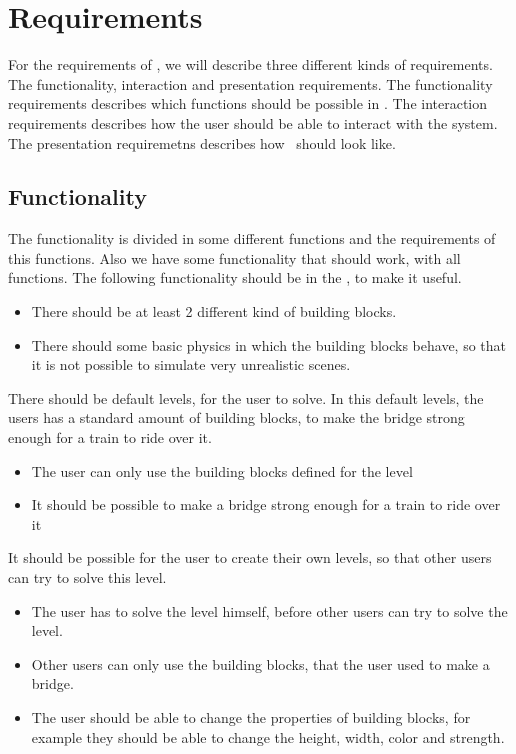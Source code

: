 \section{Requirements}
For the requirements of \name, we will describe three different kinds of requirements. The functionality, interaction and presentation requirements. The functionality requirements describes which functions should be possible in \name. The interaction requirements describes how the user should be able to interact with the system. The presentation requiremetns describes how \name \ should look like. 
 \subsection{Functionality}
 The functionality is divided in some different functions and the requirements of this functions. Also we have some functionality that should work, with all functions.
 The following functionality should be in the \name, to make it useful.
  \begin{itemize}
  \item There should be at least 2 different kind of building blocks. 
  \item There should some basic physics in which the building blocks behave, so that it is not possible to simulate very unrealistic scenes.
  \end{itemize}
  There should be default levels, for the user to solve. In this default levels, the users has a standard amount of building blocks, to make the bridge strong enough for a train to ride over it. 
 \begin{itemize}
 \item The user can only use the building blocks defined for the level
 \item It should be possible to make a bridge strong enough for a train to ride over it
 \end{itemize}
  It should be possible for the user to create their own levels, so that other users can try to solve this level. 
 \begin{itemize}
 \item The user has to solve the level himself, before other users can try to solve the level.
 \item Other users can only use the building blocks, that the user used to make a bridge.
 \item The user should be able to change the properties of building blocks, for example they should be able to change the height, width, color and strength.
 \end{itemize}

